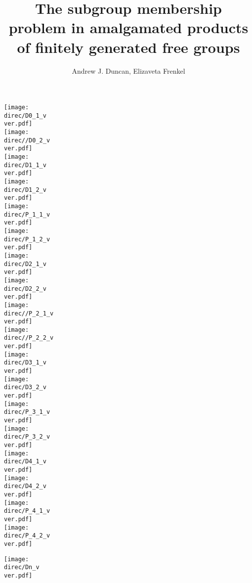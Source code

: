 \documentclass[a4paper,12pt]{article}
\title{The subgroup membership problem in amalgamated products of 
finitely generated free groups
}
\author{Andrew J. Duncan, Elizaveta Frenkel}
\newcommand{\direc}{cex}
\newcommand{\ver}{2}
\numberwithin{equation}{section}
\numberwithin{figure}{section}
\begin{document}
\begin{comment}
\texttt{[image: \\direc/stallings1.pdf]}~~\texttt{[image: \\direc/stallings2.pdf]}\\
\texttt{[image: \\direc/double1.pdf]}\\
\texttt{[image: \\direc/double2.pdf]}\\
\texttt{[image: \\direc/Kfolding.pdf]}\\
\end{comment}
\texttt{[image: \\direc/D0\_1\_v\\ver.pdf]}\\
\texttt{[image: \\direc//D0\_2\_v\\ver.pdf]}\\
\texttt{[image: \\direc/D1\_1\_v\\ver.pdf]}\\
\texttt{[image: \\direc/D1\_2\_v\\ver.pdf]}\\
\texttt{[image: \\direc/P\_1\_1\_v\\ver.pdf]}\\
\texttt{[image: \\direc/P\_1\_2\_v\\ver.pdf]}\\
\texttt{[image: \\direc/D2\_1\_v\\ver.pdf]}\\
\texttt{[image: \\direc/D2\_2\_v\\ver.pdf]}\\
\texttt{[image: \\direc//P\_2\_1\_v\\ver.pdf]}\\
\texttt{[image: \\direc//P\_2\_2\_v\\ver.pdf]}\\
\texttt{[image: \\direc/D3\_1\_v\\ver.pdf]}\\
\texttt{[image: \\direc/D3\_2\_v\\ver.pdf]}\\
\texttt{[image: \\direc/P\_3\_1\_v\\ver.pdf]}\\
\texttt{[image: \\direc/P\_3\_2\_v\\ver.pdf]}\\
\texttt{[image: \\direc/D4\_1\_v\\ver.pdf]}\\
\texttt{[image: \\direc/D4\_2\_v\\ver.pdf]}\\
\texttt{[image: \\direc/P\_4\_1\_v\\ver.pdf]}\\
\texttt{[image: \\direc/P\_4\_2\_v\\ver.pdf]}\\
\begin{comment}
\texttt{[image: \\direc/D5\_1\_v\\ver.pdf]}\\
\texttt{[image: \\direc/D5\_2\_v\\ver.pdf]}\\
\end{comment}
\texttt{[image: \\direc/Dn\_v\\ver.pdf]}\\
\begin{comment}
\texttt{[image: \\direc/D0\_1\_v2.pdf]}\\
\texttt{[image: \\direc//D0\_2\_v2.pdf]}\\
\texttt{[image: \\direc/D1\_1\_v2.pdf]}\\
\texttt{[image: \\direc/D1\_2\_v2.pdf]}\\
\texttt{[image: \\direc/Dn\_v2.pdf]}\\
\end{comment}
\end{document}
